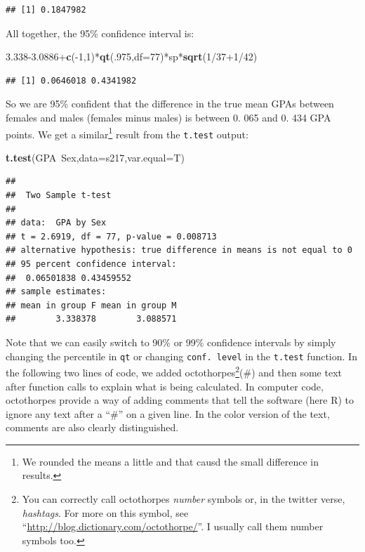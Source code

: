 \documentclass[]{book}
\newenvironment{Shaded}{\begin{snugshade}}{\end{snugshade}}
\newcommand{\KeywordTok}[1]{\textcolor[rgb]{0.13,0.29,0.53}{\textbf{{#1}}}}
\newcommand{\DataTypeTok}[1]{\textcolor[rgb]{0.13,0.29,0.53}{{#1}}}
\newcommand{\DecValTok}[1]{\textcolor[rgb]{0.00,0.00,0.81}{{#1}}}
\newcommand{\FloatTok}[1]{\textcolor[rgb]{0.00,0.00,0.81}{{#1}}}
\newcommand{\NormalTok}[1]{{#1}}
\let\rmarkdownfootnote\footnote%
\def\footnote{\protect\rmarkdownfootnote}
\begin{document}
\begin{verbatim}
## [1] 0.1847982
\end{verbatim}

All together, the 95\% confidence interval is:

\begin{Shaded}
\begin{Highlighting}[]
\FloatTok{3.338-3.0886}\NormalTok{+}\KeywordTok{c}\NormalTok{(-}\DecValTok{1}\NormalTok{,}\DecValTok{1}\NormalTok{)*}\KeywordTok{qt}\NormalTok{(.}\DecValTok{975}\NormalTok{,}\DataTypeTok{df=}\DecValTok{77}\NormalTok{)*sp*}\KeywordTok{sqrt}\NormalTok{(}\DecValTok{1}\NormalTok{/}\DecValTok{37+1}\NormalTok{/}\DecValTok{42}\NormalTok{)}
\end{Highlighting}
\end{Shaded}

\begin{verbatim}
## [1] 0.0646018 0.4341982
\end{verbatim}

So we are 95\% confident that the difference in the true mean GPAs
between females and males (females minus males) is between 0. 065 and 0.
434 GPA points. We get a similar\footnote{We rounded the means a little
  and that causd the small difference in results.} result from the
\texttt{t.test} output:

\begin{Shaded}
\begin{Highlighting}[]
\KeywordTok{t.test}\NormalTok{(GPA~Sex,}\DataTypeTok{data=}\NormalTok{s217,}\DataTypeTok{var.equal=}\NormalTok{T)}
\end{Highlighting}
\end{Shaded}

\begin{verbatim}
## 
##  Two Sample t-test
## 
## data:  GPA by Sex
## t = 2.6919, df = 77, p-value = 0.008713
## alternative hypothesis: true difference in means is not equal to 0
## 95 percent confidence interval:
##  0.06501838 0.43459552
## sample estimates:
## mean in group F mean in group M 
##        3.338378        3.088571
\end{verbatim}

Note that we can easily switch to 90\% or 99\% confidence intervals by
simply changing the percentile in \texttt{qt} or changing
\texttt{conf.\ level} in the \texttt{t.test} function. In the following
two lines of code, we added octothorpes\footnote{You can correctly call
  octothorpes \emph{number} symbols or, in the twitter verse,
  \emph{hashtags}. For more on this symbol, see
  ``\url{http://blog.dictionary.com/octothorpe/}''. I usually call them
  number symbols too.}(\#) and then some text after function calls to
explain what is being calculated. In computer code, octothorpes provide
a way of adding comments that tell the software (here R) to ignore any
text after a ``\#'' on a given line. In the color version of the text,
comments are also clearly distinguished.
\end{document}
